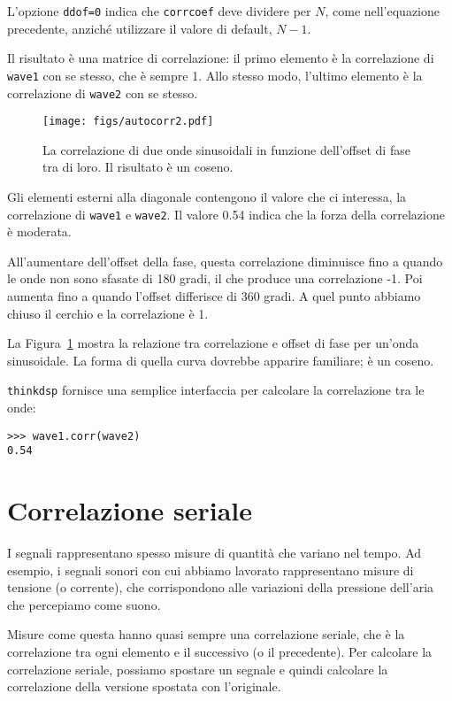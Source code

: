 \documentclass[12pt,a4paper]{book}
\begin{document}
L'opzione {\tt ddof=0} indica che {\tt corrcoef} deve dividere per $N$, come nell'equazione precedente, anziché utilizzare il valore di default, $N-1$.

Il risultato è una matrice di correlazione: il primo elemento è la correlazione di {\tt wave1} con se stesso, che è sempre 1. Allo stesso modo, l'ultimo elemento è la correlazione di {\tt wave2} con se stesso.

\begin{figure} 

\centerline{\texttt{[image: figs/autocorr2.pdf]}} \caption{La correlazione di due onde sinusoidali in funzione dell'offset di fase tra di loro. Il risultato è un coseno.} \label{fig.autocorr2} \end{figure} 

Gli elementi esterni alla diagonale contengono il valore che ci interessa, la correlazione di {\tt wave1} e {\tt wave2}. Il valore 0.54 indica che la forza della correlazione è moderata.

All'aumentare dell'offset della fase, questa correlazione diminuisce fino a quando le onde non sono sfasate di 180 gradi, il che produce una correlazione -1. Poi aumenta fino a quando l'offset differisce di 360 gradi. A quel punto abbiamo chiuso il cerchio e la correlazione è 1.

La Figura~\ref{fig.autocorr2} mostra la relazione tra correlazione e offset di fase per un'onda sinusoidale. La forma di quella curva dovrebbe apparire familiare; è un coseno.

{\tt thinkdsp} fornisce una semplice interfaccia per calcolare la correlazione tra le onde:

\begin{verbatim} 
>>> wave1.corr(wave2)
0.54
 \end{verbatim} 

\section{Correlazione seriale} 

I segnali rappresentano spesso misure di quantità che variano nel tempo. Ad esempio, i segnali sonori con cui abbiamo lavorato rappresentano misure di tensione (o corrente), che corrispondono alle variazioni della pressione dell'aria che percepiamo come suono.

Misure come questa hanno quasi sempre una correlazione seriale, che è la correlazione tra ogni elemento e il successivo (o il precedente). Per calcolare la correlazione seriale, possiamo spostare un segnale e quindi calcolare la correlazione della versione spostata con l'originale.
\end{document}
